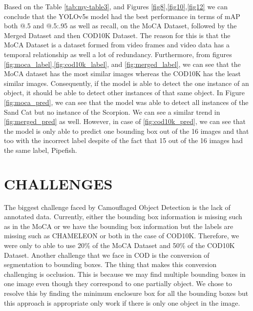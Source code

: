 \documentclass[conference]{IEEEtran}
\begin{document}
Based on the Table \ref{tab:my-table3}, and Figures \ref{fig8},\ref{fig10},\ref{fig12} we can conclude that the YOLOv5s model had the best performance in terms of mAP both @.5 and @.5:.95 as well as recall,  on the MoCA Dataset, followed by the Merged Dataset and then COD10K Dataset. The reason for this is that the MoCA Dataset is a dataset formed from video frames and video data has a temporal relationship as well a lot of redundancy. Furthermore, from figures \ref{fig:moca_label},\ref{fig:cod10k_label}, and \ref{fig:merged_label}, we can see that the MoCA dataset has the most similar images whereas the COD10K has the least similar images. Consequently, if the model is able to detect the one instance of an object, it should be able to detect other instances of that same object. In Figure \ref{fig:moca_pred}, we can see that the model was able to detect all instances of the Sand Cat but no instance of the Scorpion. We can see a similar trend in \ref{fig:merged_pred} as well. However, in case of \ref{fig:cod10k_pred}, we can see that the model is only able to predict one bounding box out of the 16 images and that too with the incorrect label despite of the fact that 15 out of the 16 images had the same label, Pipefish. 

\section{CHALLENGES}
The biggest challenge faced by Camouflaged Object Detection is the lack of annotated data. Currently, either the bounding box information is missing such as in the MoCA or we have the bounding box information but the labels are missing such as CHAMELEON or both in the case of COD10K. Therefore, we were only to able to use 20\% of the MoCA Dataset and 50\% of the COD10K Dataset. Another challenge that we face in COD is the conversion of segmentation to bounding boxes. The thing that makes this conversion challenging is occlusion. This is because we may find multiple bounding boxes in one image even though they correspond to one partially object. We chose to resolve this by finding the minimum enclosure box for all the bounding boxes but this approach is appropriate only work if there is only one object in the image.
\end{document}

